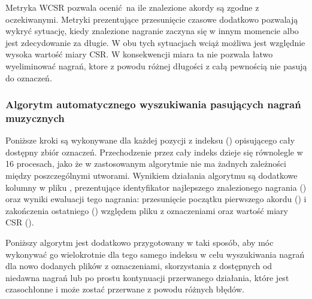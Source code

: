 Metryka WCSR pozwala ocenić na ile znalezione akordy są zgodne z oczekiwanymi. Metryki prezentujące
przesunięcie czasowe dodatkowo pozwalają wykryć sytuację, kiedy znalezione nagranie zaczyna się w
innym momencie albo jest zdecydowanie za długie. W obu tych sytuacjach wciąż możliwa jest względnie
wysoka wartość miary CSR. W konsekwencji miara ta nie pozwala łatwo wyeliminować nagrań, ktore z
powodu różnej długości z całą pewnością nie pasują do oznaczeń.

\subsubsection{Algorytm automatycznego wyszukiwania pasujących nagrań muzycznych}
Poniższe kroki są wykonywane dla każdej pozycji z indeksu () opisującego cały
dostępny zbiór oznaczeń. Przechodzenie przez cały indeks dzieje się równolegle w 16 procesach, jako
że w zastosowanym algorytmie nie ma żadnych zależności między poszczególnymi utworami. Wynikiem
działania algorytmu są dodatkowe kolumny w pliku , prezentujące identyfikator
najlepszego znalezionego nagrania () oraz wyniki ewaluacji tego nagrania:
przesunięcie początku pierwszego akordu () i zakończenia ostatniego
() względem pliku z oznaczeniami oraz wartość miary CSR ().

Poniższy algorytm jest dodatkowo przygotowany w taki sposób, aby móc wykonywać go wielokrotnie dla
tego samego indeksu w celu wyszukiwania nagrań dla nowo dodanych plików z oznaczeniami, skorzystania
z dostępnych od niedawna nagrań lub po prostu kontynuacji przerwanego działania, które jest
czasochłonne i może zostać przerwane z powodu różnych błędów.

